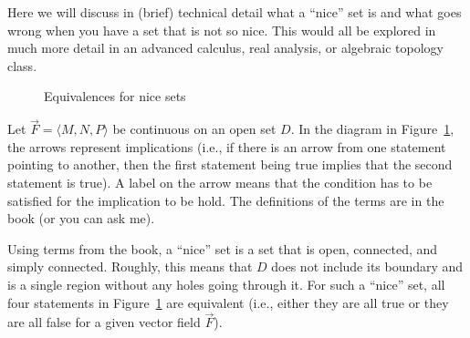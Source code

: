 Here we will discuss in (brief) technical detail what a ``nice'' set
is and what goes wrong when you have a set that is not so nice.  This
would all be explored in much more detail in an advanced calculus, real
analysis, or algebraic topology class.


\begin{figure}[t]
  \centering
  \caption{Equivalences for nice sets}
  \label{fig:equivalences}
\end{figure}


Let $\vec F=\langle M,N,P\rangle$ be continuous on an open set $D$.
In the diagram in Figure~\ref{fig:equivalences}, the arrows represent
implications (i.e., if there is an arrow from one statement pointing
to another, then the first statement being true implies that the
second statement is true).  A label on the arrow means that the
condition has to be satisfied for the implication to be hold.  The
definitions of the terms are in the book (or you can ask me).



Using terms from the book, a ``nice'' set is a set that is open,
connected, and simply connected.  Roughly, this means that $D$ does
not include its boundary and is a single region without any holes going
through it.  For such a ``nice'' set, all four statements in
Figure~\ref{fig:equivalences} are equivalent (i.e., either they are
all true or they are all false for a given vector field $\vec F$).

